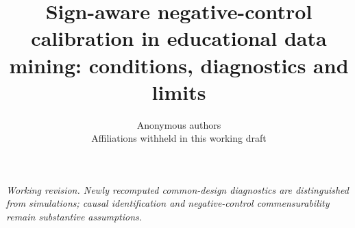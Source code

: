 \documentclass[notitlepage,12pt]{jedm}
\title{Sign-aware negative-control calibration in educational data mining: conditions, diagnostics and limits}
\date{}
\author{{\large Anonymous authors}\\Affiliations withheld in this working draft}
\begin{document}
\maketitle
\begin{abstract}

\end{abstract}
\noindent\textit{Working revision. Newly recomputed common-design diagnostics are distinguished from simulations; causal identification and negative-control commensurability remain substantive assumptions.}


\end{document}
